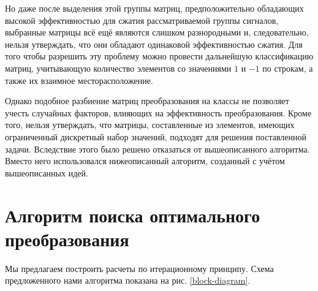 \documentclass[11pt, oneside, a4paper]{article}
\begin{document}
Но даже после выделения этой группы матриц, предположительно обладающих высокой эффективностью для сжатия рассматриваемой группы сигналов, выбранные матрицы всё ещё являются слишком разнородными и, следовательно, нельзя утверждать, что они обладают одинаковой эффективностью сжатия. Для того чтобы разрешить эту проблему можно провести дальнейшую классификацию матриц, учитывающую количество элементов со значениями $1$ и $-1$ по строкам, а также их взаимное месторасположение. 

Однако подобное разбиение матриц преобразования на классы не позволяет учесть случайных факторов, влияющих на эффективность преобразования. Кроме того, нельзя утверждать, что матрицы, составленные из элементов, имеющих ограниченный дискретный набор значений, подходят для решения поставленной задачи. Вследствие этого было решено отказаться от вышеописанного алгоритма. Вместо него использовался нижеописанный алгоритм, созданный с учётом вышеописанных идей.

\section{Алгоритм поиска оптимального преобразования}

Мы предлагаем построить расчеты по итерационному принципу. Схема предложенного нами алгоритма показана на рис. \ref{block-diagram}.
\end{document}
